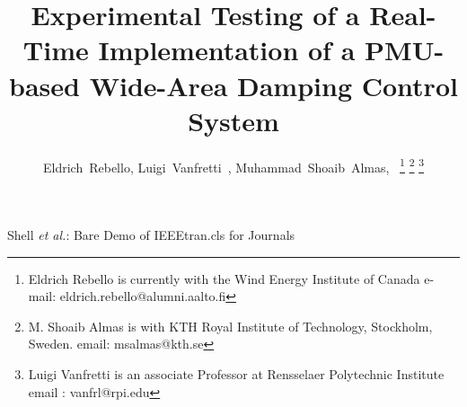 \documentclass[journal]{IEEEtran}
\begin{document}
%
\title{Experimental Testing of a Real-Time Implementation of a PMU-based Wide-Area Damping Control System}
%
%
%


\author{Eldrich~Rebello, Luigi~Vanfretti~, Muhammad~Shoaib~Almas,~
\thanks{Eldrich Rebello is currently with the Wind Energy Institute of Canada
e-mail:  \mbox{eldrich.rebello@alumni.aalto.fi}}%
\thanks{M. Shoaib Almas is with KTH Royal Institute of Technology, Stockholm, Sweden. email: msalmas@kth.se}%
\thanks{Luigi Vanfretti is an associate Professor at Rensselaer Polytechnic Institute  email : vanfrl@rpi.edu}}

% 
%



%
{Shell \MakeLowercase{\textit{et al.}}: Bare Demo of IEEEtran.cls for Journals}
% 
\end{document}
